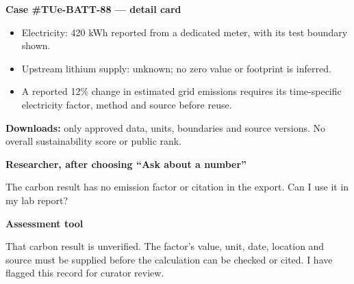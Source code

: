 \begin{queryscreen}
\textbf{Case \#TUe-BATT-88 --- detail card}\par
\begin{itemize}[nosep,leftmargin=1.5em]
  \item Electricity: 420 kWh reported from a dedicated meter, with its test boundary shown.
  \item Upstream lithium supply: unknown; no zero value or footprint is inferred.
  \item A reported 12\% change in estimated grid emissions requires its time-specific electricity factor, method and source before reuse.
\end{itemize}
\textbf{Downloads:} only approved data, units, boundaries and source versions. No overall sustainability score or public rank.\par\medskip
{}\quad
{}\quad
{}
\end{queryscreen}

\begin{flushright}\begin{queryuser}
\textbf{Researcher, after choosing ``Ask about a number''}\par
The carbon result has no emission factor or citation in the export. Can I use it in my lab report?
\end{queryuser}\end{flushright}

\begin{queryscreen}
\textbf{Assessment tool}\par
That carbon result is unverified. The factor's value, unit, date, location and source must be supplied before the calculation can be checked or cited. I have flagged this record for curator review.\par\medskip
{}\quad
{}\quad
{}
\end{queryscreen}
